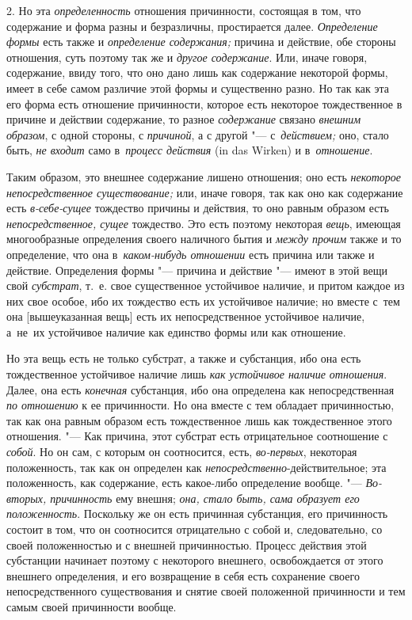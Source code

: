 2. Но эта {\em определенность} отношения причинности, состоящая в том, что
содержание и форма разны и безразличны, простирается далее. {\em Определение
формы} есть также и {\em определение содержания;} причина и действие, обе
стороны отношения, суть поэтому так же и {\em другое содержание}. Или, иначе
говоря, содержание, ввиду того, что оно дано лишь как содержание некоторой
формы, имеет в себе самом различие этой формы и существенно разно. Но так как
эта его форма есть отношение причинности, которое есть некоторое тождественное
в причине и действии содержание, то разное {\em содержание} связано
{\em внешним образом}, с одной стороны, с {\em причиной}, а с другой "---
с~{\em действием;} оно, стало быть, {\em не входит} само
в~{\em процесс действия} (in das Wir\-ken) и в~{\em отношение}.

Таким образом, это внешнее содержание лишено отношения; оно есть
{\em некоторое непосредственное существование;} или, иначе говоря, так как оно
как содержание есть {\em в-себе-сущее} тождество причины и действия, то оно
равным образом есть {\em непосредственное, сущее} тождество. Это есть поэтому
некоторая {\em вещь}, имеющая многообразные определения своего наличного бытия
и {\em между прочим} также и то определение, что она
в~{\em каком-нибудь отношении} есть причина или также и действие. Определения
формы "--- причина и действие "--- имеют в этой вещи свой {\em субстрат}, т.~е.
свое существенное устойчивое наличие, и притом каждое из них свое особое, ибо
их тождество есть их устойчивое наличие; но вместе с~тем она
[вышеуказанная вещь] есть их непосредственное устойчивое наличие,
а~не~их устойчивое наличие как единство формы или как отношение.

Но эта вещь есть не только субстрат, а также и субстанция, ибо она есть
тождественное устойчивое наличие лишь {\em как устойчивое наличие отношения}.
Далее, она есть {\em конечная} субстанция, ибо она определена как
непосредственная {\em по отношению} к ее причинности. Но она вместе с тем
обладает причинностью, так как она равным образом есть тождественное лишь как
тождественное этого отношения. "--- Как причина, этот субстрат есть
отрицательное соотношение с {\em собой}. Но он сам, с которым он соотносится,
есть, {\em во-первых}, некоторая положенность, так как он определен как
{\em непосредственно}-действительное; эта положенность, как содержание, есть
какое-либо определение вообще. "--- {\em Во-вторых, причинность} ему
внешня; {\em она, стало быть, сама образует его положенность}. Поскольку же он
есть причинная субстанция, его причинность состоит в том, что он соотносится
отрицательно с собой и, следовательно, со своей положенностью и с внешней
причинностью. Процесс действия этой субстанции начинает поэтому с некоторого
внешнего, освобождается от этого внешнего определения, и его возвращение в себя
есть сохранение своего непосредственного существования и снятие своей
положенной причинности и тем самым своей причинности вообще.

